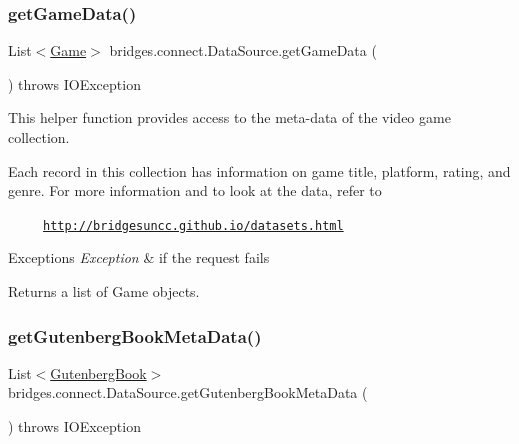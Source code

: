 \subsubsection{\texorpdfstring{get\+Game\+Data()}{getGameData()}}
{\footnotesize\ttfamily List$<$\hyperlink{classbridges_1_1data__src__dependent_1_1_game}{Game}$>$ bridges.\+connect.\+Data\+Source.\+get\+Game\+Data (\begin{DoxyParamCaption}{ }\end{DoxyParamCaption}) throws I\+O\+Exception}

This helper function provides access to the meta-\/data of the video game collection.

Each record in this collection has information on game title, platform, rating, and genre. For more information and to look at the data, refer to 

~~~~~\href{http://bridgesuncc.github.io/datasets.html}{\tt http\+://bridgesuncc.\+github.\+io/datasets.\+html} 


\begin{DoxyExceptions}{Exceptions}
{\em Exception} & if the request fails\\
\hline
\end{DoxyExceptions}
\begin{DoxyReturn}{Returns}
a list of Game objects. 
\end{DoxyReturn}
\mbox{\label{classbridges_1_1connect_1_1_data_source_aff3adc9d08624062469315f2fe059044}} 
\subsubsection{\texorpdfstring{get\+Gutenberg\+Book\+Meta\+Data()}{getGutenbergBookMetaData()}\hspace{0.1cm}{\footnotesize\ttfamily [1/2]}}
{\footnotesize\ttfamily List$<$\hyperlink{classbridges_1_1data__src__dependent_1_1_gutenberg_book}{Gutenberg\+Book}$>$ bridges.\+connect.\+Data\+Source.\+get\+Gutenberg\+Book\+Meta\+Data (\begin{DoxyParamCaption}{ }\end{DoxyParamCaption}) throws I\+O\+Exception}

